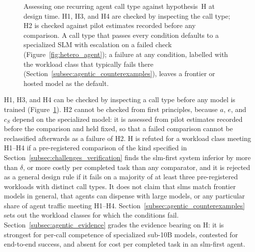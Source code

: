 \begin{figure}[t]
\caption{Assessing one recurring agent call type against hypothesis~H at design time. H1, H3, and H4 are checked by inspecting the call type; H2 is checked against pilot estimates recorded before any comparison. A call type that passes every condition defaults to a specialized SLM with escalation on a failed check (Figure~\ref{fig:hetero_agent}); a failure at any condition, labelled with the workload class that typically fails there (Section~\ref{subsec:agentic_counterexamples}), leaves a frontier or hosted model as the default.}
\label{fig:hypothesis_conditions}
\end{figure}

H1, H3, and H4 can be checked by inspecting a call type before any model is trained (Figure~\ref{fig:hypothesis_conditions}). H2 cannot be checked from first principles, because $a$, $e$, and $c_S$ depend on the specialized model: it is assessed from pilot estimates recorded before the comparison and held fixed, so that a failed comparison cannot be reclassified afterwards as a failure of H2. H is refuted for a workload class meeting H1--H4 if a pre-registered comparison of the kind specified in Section~\ref{subsec:challenges_verification} finds the \gls{slm}-first system inferior by more than $\delta$, or more costly per completed task than any comparator, and it is rejected as a general design rule if it fails on a majority of at least three pre-registered workloads with distinct call types. It does not claim that \glspl{slm} match frontier models in general, that agents can dispense with large models, or any particular share of agent traffic meeting H1--H4. Section~\ref{subsec:agentic_counterexamples} sets out the workload classes for which the conditions fail. Section~\ref{subsec:agentic_evidence} grades the evidence bearing on H: it is strongest for per-call competence of specialized sub-10B models, contested for end-to-end success, and absent for cost per completed task in an \gls{slm}-first agent.

